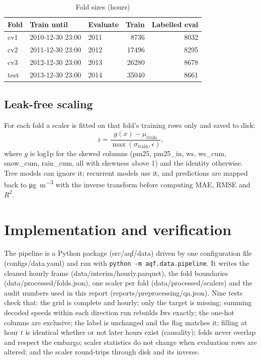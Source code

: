 \documentclass[conference]{IEEEtran}
\begin{document}
\begin{table}[t]
\centering
\caption{Fold sizes (hours)}
\label{tab:folds}
\begin{tabular}{@{}lllrr@{}}
\toprule
Fold & Train until & Evaluate & Train & Labelled eval \\
\midrule
cv1 & 2010-12-30 23:00 & 2011 & \num{8736} & \num{8032} \\
cv2 & 2011-12-30 23:00 & 2012 & \num{17496} & \num{8295} \\
cv3 & 2012-12-30 23:00 & 2013 & \num{26280} & \num{8678} \\
test & 2013-12-30 23:00 & 2014 & \num{35040} & \num{8661} \\
\bottomrule
\end{tabular}
\end{table}

\subsection{Leak-free scaling}
For each fold a scaler is fitted on that fold's training rows only and saved to disk:
\begin{equation}
z = \frac{g(x) - \mu_{\text{train}}}{\max(\sigma_{\text{train}}, \epsilon)},
\end{equation}
where $g$ is log1p for the skewed columns (pm25, pm25\_in, ws, ws\_cum, snow\_cum, rain\_cum, all with skewness above 1) and the identity otherwise. Tree models can ignore it; recurrent models use it, and predictions are mapped back to \si{\micro\gram\per\cubic\metre} with the inverse transform before computing MAE, RMSE and $R^2$.

\section{Implementation and verification}
The pipeline is a Python package (src/aqf/data) driven by one configuration file (configs/data.yaml) and run with \texttt{python -m aqf.data.pipeline}. It writes the cleaned hourly frame (data/interim/hourly.parquet), the fold boundaries (data/processed/folds.json), one scaler per fold (data/processed/scalers) and the audit numbers used in this report (reports/preprocessing/qa.json). Nine tests check that: the grid is complete and hourly; only the target is missing; summing decoded speeds within each direction run rebuilds Iws exactly; the one-hot columns are exclusive; the label is unchanged and the flag matches it; filling at hour $t$ is identical whether or not later hours exist (causality); folds never overlap and respect the embargo; scaler statistics do not change when evaluation rows are altered; and the scaler round-trips through disk and its inverse.
\end{document}
